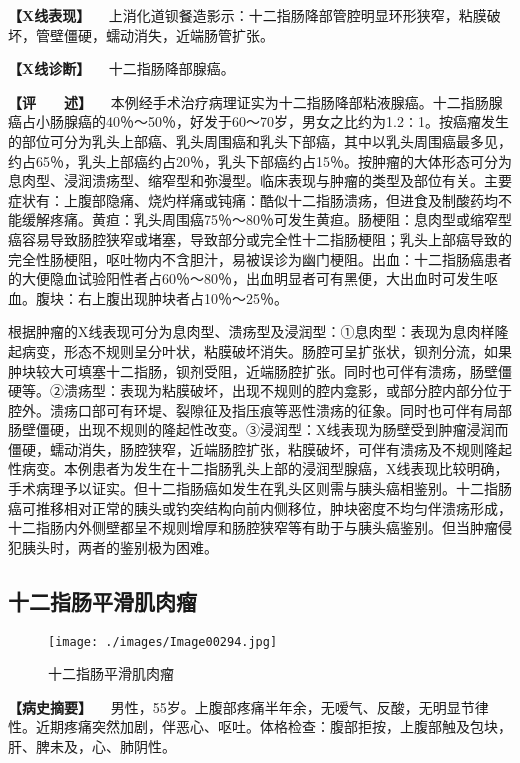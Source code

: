 \textbf{【X线表现】}
　上消化道钡餐造影示：十二指肠降部管腔明显环形狭窄，粘膜破坏，管壁僵硬，蠕动消失，近端肠管扩张。

\textbf{【X线诊断】} 　十二指肠降部腺癌。

\textbf{【评　　述】}
　本例经手术治疗病理证实为十二指肠降部粘液腺癌。十二指肠腺癌占小肠腺癌的40％～50％，好发于60～70岁，男女之比约为1.2∶1。按癌瘤发生的部位可分为乳头上部癌、乳头周围癌和乳头下部癌，其中以乳头周围癌最多见，约占65％，乳头上部癌约占20％，乳头下部癌约占15％。按肿瘤的大体形态可分为息肉型、浸润溃疡型、缩窄型和弥漫型。临床表现与肿瘤的类型及部位有关。主要症状有：上腹部隐痛、烧灼样痛或钝痛：酷似十二指肠溃疡，但进食及制酸药均不能缓解疼痛。黄疸：乳头周围癌75％～80％可发生黄疸。肠梗阻：息肉型或缩窄型癌容易导致肠腔狭窄或堵塞，导致部分或完全性十二指肠梗阻；乳头上部癌导致的完全性肠梗阻，呕吐物内不含胆汁，易被误诊为幽门梗阻。出血：十二指肠癌患者的大便隐血试验阳性者占60％～80％，出血明显者可有黑便，大出血时可发生呕血。腹块：右上腹出现肿块者占10％～25％。

根据肿瘤的X线表现可分为息肉型、溃疡型及浸润型：①息肉型：表现为息肉样隆起病变，形态不规则呈分叶状，粘膜破坏消失。肠腔可呈扩张状，钡剂分流，如果肿块较大可填塞十二指肠，钡剂受阻，近端肠腔扩张。同时也可伴有溃疡，肠壁僵硬等。②溃疡型：表现为粘膜破坏，出现不规则的腔内龛影，或部分腔内部分位于腔外。溃疡口部可有环堤、裂隙征及指压痕等恶性溃疡的征象。同时也可伴有局部肠壁僵硬，出现不规则的隆起性改变。③浸润型：X线表现为肠壁受到肿瘤浸润而僵硬，蠕动消失，肠腔狭窄，近端肠腔扩张，粘膜破坏，可伴有溃疡及不规则隆起性病变。本例患者为发生在十二指肠乳头上部的浸润型腺癌，X线表现比较明确，手术病理予以证实。但十二指肠癌如发生在乳头区则需与胰头癌相鉴别。十二指肠癌可推移相对正常的胰头或钓突结构向前内侧移位，肿块密度不均匀伴溃疡形成，十二指肠内外侧壁都呈不规则增厚和肠腔狭窄等有助于与胰头癌鉴别。但当肿瘤侵犯胰头时，两者的鉴别极为困难。

\subsection{十二指肠平滑肌肉瘤}

\begin{figure}[!htbp]
 \centering
 \texttt{[image: ./images/Image00294.jpg]}
 \captionsetup{justification=centering}
 \caption{十二指肠平滑肌肉瘤}
 \label{fig5-4-8}
  \end{figure} 

\textbf{【病史摘要】}
　男性，55岁。上腹部疼痛半年余，无嗳气、反酸，无明显节律性。近期疼痛突然加剧，伴恶心、呕吐。体格检查：腹部拒按，上腹部触及包块，肝、脾未及，心、肺阴性。

